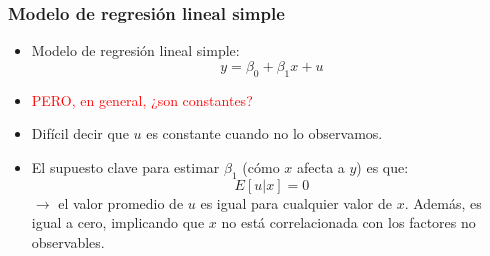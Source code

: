 \documentclass{beamer}
\begin{document}

\begin{frame}
	\frametitle{Modelo de regresión lineal simple} %
    \begin{itemize}
        \item Modelo de regresión lineal simple:
        \begin{equation}
            y = \beta_0 + \beta_1 x + u \tag{2}
        \end{equation}
        \item \textcolor{red}{PERO, en general, ¿son constantes?}
        \item Difícil decir que $u$ es constante cuando no lo observamos.
        \item El supuesto clave para estimar $\beta_1$ (cómo $x$ afecta a $y$) es que:
        \begin{equation*}
            E[u|x] = 0
        \end{equation*}
        $\rightarrow$ el valor promedio de $u$ es igual para cualquier valor de $x$. Además, es igual a cero, implicando que $x$ no está correlacionada con los factores no observables.
    \end{itemize}
\end{frame}
\end{document}
